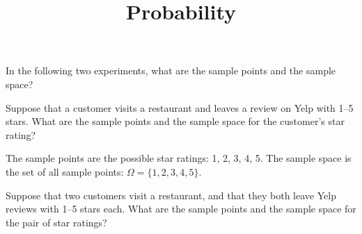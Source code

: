 \documentclass[11pt]{exam}
\title{Probability}
\begin{document}
\begin{questions}



\question In the following two experiments, what are the sample points and the
sample space?



\question Suppose that a customer visits a restaurant and leaves a review on
Yelp with 1--5 stars.  What are the sample points and the sample space for the
customer's star rating?

\begin{solution}
The sample points are the possible star ratings: 1, 2, 3, 4, 5.  The sample
space is the set of all sample points: $\Omega = \{ 1, 2, 3, 4, 5 \}$.
\end{solution}



\question Suppose that two customers visit a restaurant, and that they both
leave Yelp reviews with 1--5 stars each.
What are the sample points and the sample space for the pair of star ratings?


\end{questions}
\end{document}
